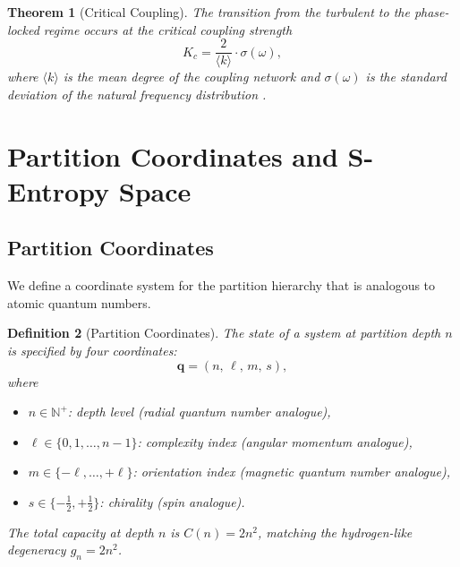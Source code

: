 \documentclass[twocolumn,10pt]{article}
\newtheorem{theorem}{Theorem}[section]
\newtheorem{definition}[theorem]{Definition}
\newcommand{\partition}[4]{(#1,\,#2,\,#3,\,#4)}
\begin{document}
\begin{theorem}[Critical Coupling]
\label{thm:critical}
The transition from the turbulent to the phase-locked regime occurs at the critical coupling strength
\begin{equation}
  K_{c} = \frac{2}{\langle k \rangle} \cdot \sigma(\omega),
  \label{eq:kc}
\end{equation}
where $\langle k \rangle$ is the mean degree of the coupling network and $\sigma(\omega)$ is the standard deviation of the natural frequency distribution \citep{strogatz2000kuramoto}.
\end{theorem}

\section{Partition Coordinates and S-Entropy Space}
\label{sec:coordinates}

\subsection{Partition Coordinates}

We define a coordinate system for the partition hierarchy that is analogous to atomic quantum numbers.

\begin{definition}[Partition Coordinates]
\label{def:partition_coords}
The state of a system at partition depth $n$ is specified by four coordinates:
\begin{equation}
  \mathbf{q} = \partition{n}{\ell}{m}{s},
  \label{eq:partition_coords}
\end{equation}
where
\begin{itemize}[nosep]
  \item $n \in \mathbb{N}^{+}$: depth level (radial quantum number analogue),
  \item $\ell \in \{0, 1, \ldots, n-1\}$: complexity index (angular momentum analogue),
  \item $m \in \{-\ell, \ldots, +\ell\}$: orientation index (magnetic quantum number analogue),
  \item $s \in \{-\tfrac{1}{2}, +\tfrac{1}{2}\}$: chirality (spin analogue).
\end{itemize}
The total capacity at depth $n$ is $C(n) = 2n^{2}$, matching the hydrogen-like degeneracy $g_{n} = 2n^{2}$.
\end{definition}
\end{document}
